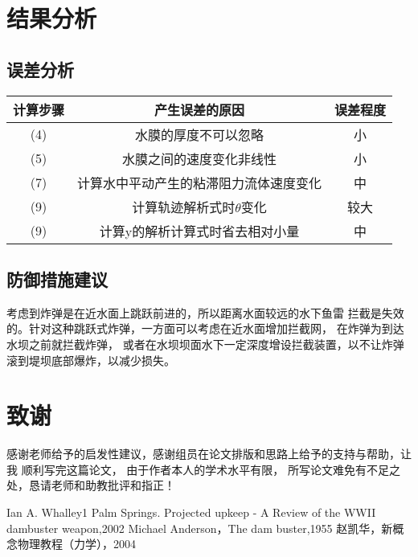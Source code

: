 \documentclass[UTF8]{ctexart}
\begin{document}
 \section{结果分析}

  

\subsection{误差分析}




  
  \begin{tabular}{|c|c|c|}
   
\hline

计算步骤&产生误差的原因&误差程度\\
\hline 
(4)&水膜的厚度不可以忽略&小\\
\hline 
(5)&水膜之间的速度变化非线性&小\\
\hline
(7)&计算水中平动产生的粘滞阻力流体速度变化&中\\
\hline
(9)&计算轨迹解析式时$\theta$变化&较大 \\
\hline
(9)&计算y的解析计算式时省去相对小量&中\\
\hline 
  
 
  \end{tabular}


  \subsection{防御措施建议}
     考虑到炸弹是在近水面上跳跃前进的，所以距离水面较远的水下鱼雷
     拦截是失效的。针对这种跳跃式炸弹，一方面可以考虑在近水面增加拦截网，
     在炸弹为到达水坝之前就拦截炸弹，
     或者在水坝坝面水下一定深度增设拦截装置，以不让炸弹滚到堤坝底部爆炸，以减少损失。


    \section{致谢}
    感谢老师给予的启发性建议，感谢组员在论文排版和思路上给予的支持与帮助，让我
    顺利写完这篇论文，
    由于作者本人的学术水平有限，
    所写论文难免有不足之处，恳请老师和助教批评和指正！
      

 \begin{thebibliography}{1}

  Ian A. Whalley1
Palm Springs.
Projected upkeep - A Review of the WWII dambuster weapon,2002
\bibitem{}
Michael Anderson，The dam buster,1955
\bibitem{}
 赵凯华，新概念物理教程（力学），2004

    
  
  \end{thebibliography}
  
\end{document}
